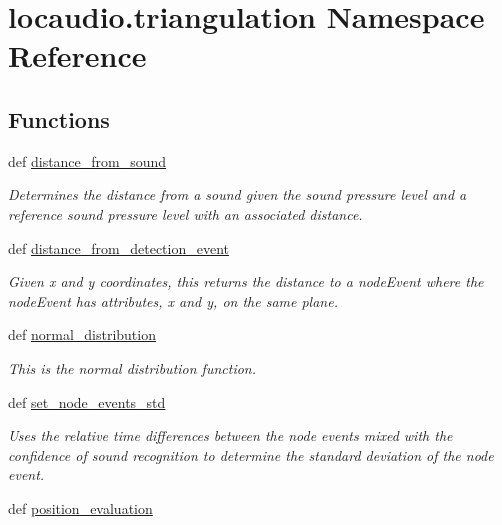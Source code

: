 \hypertarget{namespacelocaudio_1_1triangulation}{\section{locaudio.\-triangulation Namespace Reference}
\label{namespacelocaudio_1_1triangulation}
}
\subsection*{Functions}
\begin{DoxyCompactItemize}
\item 
def \hyperlink{namespacelocaudio_1_1triangulation_aa6072b3aad637ae71a38424f23014a86}{distance\-\_\-from\-\_\-sound}
\begin{DoxyCompactList}\small\item\em Determines the distance from a sound given the sound pressure level and a reference sound pressure level with an associated distance. \end{DoxyCompactList}\item 
def \hyperlink{namespacelocaudio_1_1triangulation_a1206790ce9fd39f59ce264ac7c7fb443}{distance\-\_\-from\-\_\-detection\-\_\-event}
\begin{DoxyCompactList}\small\item\em Given x and y coordinates, this returns the distance to a node\-Event where the node\-Event has attributes, x and y, on the same plane. \end{DoxyCompactList}\item 
def \hyperlink{namespacelocaudio_1_1triangulation_aa221cba0226b13aff028ca9155dfbd76}{normal\-\_\-distribution}
\begin{DoxyCompactList}\small\item\em This is the normal distribution function. \end{DoxyCompactList}\item 
def \hyperlink{namespacelocaudio_1_1triangulation_ad44e1bed6beed7ee59cffc4c230f7144}{set\-\_\-node\-\_\-events\-\_\-std}
\begin{DoxyCompactList}\small\item\em Uses the relative time differences between the node events mixed with the confidence of sound recognition to determine the standard deviation of the node event. \end{DoxyCompactList}\item 
def \hyperlink{namespacelocaudio_1_1triangulation_acf50f5be4536fb0929c359396d41828f}{position\-\_\-evaluation}

\end{DoxyCompactItemize}
